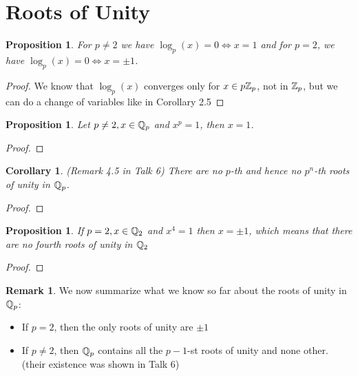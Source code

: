 \documentclass[a4paper]{article}
\theoremstyle{plain}
\newtheorem{prop}[thm]{Proposition}
\newtheorem{Cor}[thm]{Corollary}
\theoremstyle{definition}
\newtheorem{rem}[thm]{Remark}
\begin{document}
\section{Roots of Unity}
\begin{prop}
  For $p \neq 2$ we have $\log_{p}(x)=0 \iff x=1$ and for $p = 2$, we have $\log_{p}(x)=0 \iff x= \pm 1$.
\end{prop}
\begin{proof}
  We know that $\log_{p}(x)$ converges only for $x \in p\Bbb Z_{p}$, not in $\Bbb Z_{p}$, but we can do a change of variables like in Corollary 2.5
\end{proof}
\begin{prop}
  Let $p \neq 2, x \in \Bbb Q_{p}$ and $x^{p}=1$, then $x=1$.
\end{prop}
\begin{proof}
\end{proof}
\begin{Cor}
  (Remark 4.5 in Talk 6) There are no $p$-th and hence no $p^{n}$-th roots of unity in $\Bbb Q_{p}$.
\end{Cor}
\begin{proof}
\end{proof}
\begin{prop} If $p = 2, x \in \Bbb Q_{2}$ and $x^{4} = 1$ then $x = \pm 1$, which means that there are no fourth roots of unity in $\Bbb Q_{2}$
\end{prop}
\begin{proof}
\end{proof}
\begin{rem}
  We now summarize what we know so far about the roots of unity in $\Bbb Q_{p}$:
  \begin{itemize}
    \item If $p=2$, then the only roots of unity are $\pm 1$
    \item If $p \neq 2$, then $\Bbb Q_{p}$ contains all the $p-1$-st roots of unity and none other. (their existence was shown in Talk 6)
  \end{itemize}

\end{rem}
\end{document}
